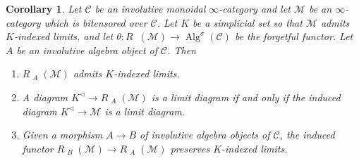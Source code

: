 \documentclass{article}
\DeclareMathOperator{\Alg}{Alg}
\DeclareMathOperator{\Modh}{{}^{\sigma}Mod} %
\newtheorem{corollary}[theorem]{Corollary}
\theoremstyle{definition}
\begin{document}
\begin{corollary}
    Let $ \mathcal{C} $ be an involutive monoidal $ \infty $-category and let $ \mathcal{M} $ be an $ \infty $-category which is bitensored over $ \mathcal{C} $. 
    Let $ K $ be a simplicial set so that $ \mathcal{M} $ admits $ K $-indexed limits, and let $ \theta \colon R\Modh(\mathcal{M}) \to \Alg^\sigma(\mathcal{C}) $ be the forgetful functor. 
    Let $ A $ be an involutive algebra object of $ \mathcal{C} $. 
    Then
    \begin{enumerate}[label=(\arabic*)]
        \item $ R\Modh_A(\mathcal{M}) $ admits $ K $-indexed limits. 
        \item A diagram $ K^{\triangleleft} \to R\Modh_A(\mathcal{M}) $ is a limit diagram if and only if the induced diagram $ K^{\triangleleft} \to \mathcal{M} $ is a limit diagram. 
        \item Given a morphism $ A \to B $ of involutive algebra objects of $ \mathcal{C} $, the induced functor $ R\Modh_B(\mathcal{M}) \to R\Modh_A(\mathcal{M}) $ preserves $ K $-indexed limits. 
    \end{enumerate}
\end{corollary}
\end{document}
